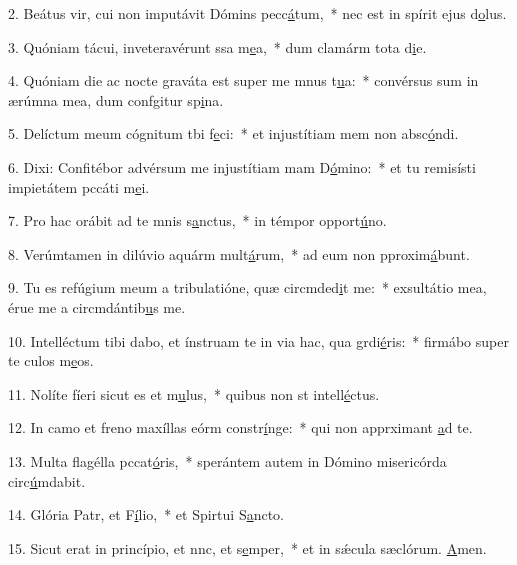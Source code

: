 2. Beátus vir, cui non imputávit Dómins pecc\uline{á}tum,~* nec est in spírit ejus d\uline{o}lus.\par 
3. Quóniam tácui, inveteravérunt ssa m\uline{e}a,~* dum clamárm tota d\uline{i}e.\par 
4. Quóniam die ac nocte graváta est super me mnus t\uline{u}a:~* convérsus sum in ærúmna mea, dum confgitur sp\uline{i}na.\par 
5. Delíctum meum cógnitum tbi f\uline{e}ci:~* et injustítiam mem non absc\uline{ó}ndi.\par 
6. Dixi: Confitébor advérsum me injustítiam mam D\uline{ó}mino:~* et tu remisísti impietátem pccáti m\uline{e}i.\par 
7. Pro hac orábit ad te mnis s\uline{a}nctus,~* in témpor opport\uline{ú}no.\par 
8. Verúmtamen in dilúvio aquárm mult\uline{á}rum,~* ad eum non pproxim\uline{á}bunt.\par 
9. Tu es refúgium meum a tribulatióne, quæ circmded\uline{i}t me:~* exsultátio mea, érue me a circmdántib\uline{u}s me.\par 
10. Intelléctum tibi dabo, et ínstruam te in via hac, qua grdi\uline{é}ris:~* firmábo super te culos m\uline{e}os.\par 
11. Nolíte fíeri sicut es et m\uline{u}lus,~* quibus non st intell\uline{é}ctus.\par 
12. In camo et freno maxíllas eórm constr\uline{í}nge:~* qui non apprximant \uline{a}d te.\par 
13. Multa flagélla pccat\uline{ó}ris,~* sperántem autem in Dómino misericórda circ\uline{ú}mdabit.\par 
14. Glória Patr, et F\uline{í}lio,~* et Spirtui S\uline{a}ncto.\par 
15. Sicut erat in princípio, et nnc, et s\uline{e}mper,~* et in sǽcula sæclórum. \uline{A}men.\par 
